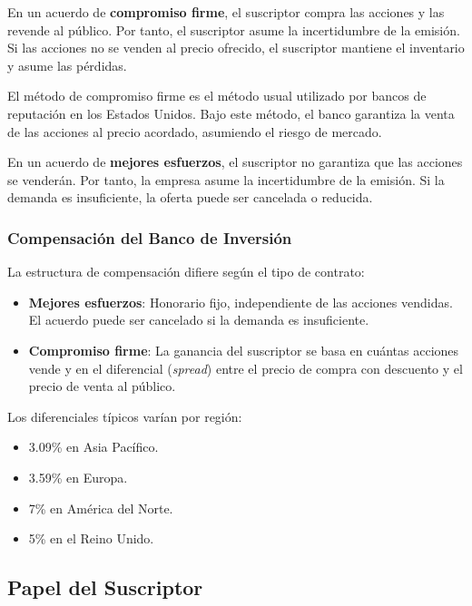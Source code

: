 \begin{definicion}
En un acuerdo de \textbf{compromiso firme}, el suscriptor compra las acciones y las revende al público. Por tanto, el suscriptor asume la incertidumbre de la emisión. Si las acciones no se venden al precio ofrecido, el suscriptor mantiene el inventario y asume las pérdidas.
\end{definicion}

El método de compromiso firme es el método usual utilizado por bancos de reputación en los Estados Unidos. Bajo este método, el banco garantiza la venta de las acciones al precio acordado, asumiendo el riesgo de mercado.

\begin{definicion}
En un acuerdo de \textbf{mejores esfuerzos}, el suscriptor no garantiza que las acciones se venderán. Por tanto, la empresa asume la incertidumbre de la emisión. Si la demanda es insuficiente, la oferta puede ser cancelada o reducida.
\end{definicion}

\subsubsection{Compensación del Banco de Inversión}

La estructura de compensación difiere según el tipo de contrato:

\begin{itemize}
\item \textbf{Mejores esfuerzos}: Honorario fijo, independiente de las acciones vendidas. El acuerdo puede ser cancelado si la demanda es insuficiente.
\item \textbf{Compromiso firme}: La ganancia del suscriptor se basa en cuántas acciones vende y en el diferencial (\textit{spread}) entre el precio de compra con descuento y el precio de venta al público.
\end{itemize}

Los diferenciales típicos varían por región:
\begin{itemize}
\item 3.09\% en Asia Pacífico.
\item 3.59\% en Europa.
\item 7\% en América del Norte.
\item 5\% en el Reino Unido.
\end{itemize}

\subsection{Papel del Suscriptor}

